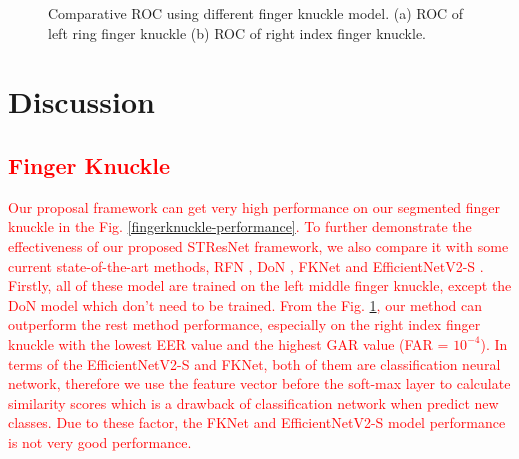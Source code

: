 \begin{figure}[ht]
    \centering
    \caption{Comparative ROC using different finger knuckle model. (a) ROC of left ring finger knuckle (b) ROC of right index finger knuckle.}
    \label{compare-fingerknuckle}
\end{figure}

\section{Discussion\label{discussion}}

\textcolor{red}{\subsection{Finger Knuckle}}
\textcolor{red}{Our proposal framework can get very high performance on our segmented finger knuckle in the Fig. \ref{fingerknuckle-performance}. To further demonstrate the effectiveness of our proposed STResNet framework, we also compare it with some current state-of-the-art methods, RFN \cite{liu2020contactless}, DoN \cite{zheng20163d}, FKNet \cite{cheng2020deep} and EfficientNetV2-S \cite{tan2021efficientnetv2}. Firstly, all of these model are trained on the left middle finger knuckle, except the DoN model which don't need to be trained. From the Fig. \ref{compare-fingerknuckle}, our method can outperform the rest method performance, especially on the right index finger knuckle with the lowest EER value and the highest GAR value (FAR = $10^{-4}$). In terms of the EfficientNetV2-S and FKNet, both of them are classification neural network, therefore we use the feature vector before the soft-max layer to calculate similarity scores which is a drawback of classification network when predict new classes. Due to these factor, the FKNet and EfficientNetV2-S model performance is not very good performance.}


